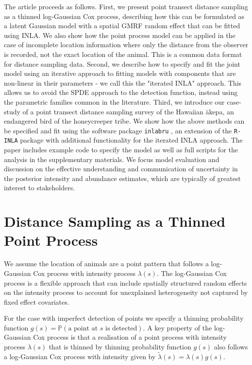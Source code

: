 \documentclass[preprint,12pt]{elsarticle}
\newcommand{\tl}{\tilde{\lambda}}   %
\newcommand{\akepa}{\textquotesingle\={a}kepa}  %
\begin{document}
The article proceeds as follows.  First, we present point transect distance sampling as a thinned log-Gaussian Cox process, describing how this can be formulated as a latent Gaussian model with a spatial GMRF random effect that can be fitted using INLA.  We also show how the point process model can be applied in the case of incomplete location information where only the distance from the observer is recorded, not the exact location of the animal.  This is a common data format for distance sampling data.  Second, we describe how to specify and fit the joint model using an iterative approach to fitting models with components that are non-linear in their parameters - we call this the "iterated INLA" approach.  This allows us to avoid the SPDE approach to the detection function, instead using the parametric families common in the literature.  Third, we introduce our case-study of a point transect distance sampling survey of the Hawaiian \akepa{}, an endangered bird of the honeycreeper tribe.  We show how the above methods can be specified and fit using the software package \texttt{inlabru} \citep{bachl_inlabru_2019}, an extension of the \texttt{R-INLA} package with additional functionality for the iterated INLA approach.  The paper includes example code to specify the model as well as full scripts for the analysis in the supplementary materials. We focus model evaluation and discussion on the effective understanding and communication of uncertainty in the posterior intensity and abundance estimates, which are typically of greatest interest to stakeholders.


\section*{Distance Sampling as a Thinned Point Process}

We assume the location of animals are a point pattern that follows a log-Gaussian Cox process with intensity process $\lambda(s)$.  The log-Gaussian Cox process is a flexible approach that can include spatially structured random effects on the intensity process to account for unexplained heterogeneity not captured by fixed effect covariates.

\sloppy For the case with imperfect detection of points we specify a thinning probability function $g(s) = \mathbb{P}(\text{a point at $s$ is detected})$. A key property of the log-Gaussian Cox process is that a realisation of a point process with intensity process $\lambda(s)$ that is thinned by thinning probability function $g(s)$ also follows a log-Gaussian Cox process with intensity given by $\tl(s) = \lambda(s)g(s)$.
\end{document}
